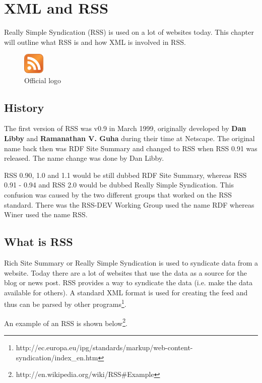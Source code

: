 \chapter{XML and RSS}
\label{chap:XML and RSS}
Really Simple Syndication (RSS) is used on a lot of websites today. This chapter will outline what RSS is and how XML is involved in RSS.

\begin{figure}[ht]
\begin{center}
\includegraphics[width=1cm]{Chapters/01_rss_icon.png}
\caption{Official logo\footnotemark}
\end{center}
\end{figure}


\section{History}
The first version of RSS was v0.9 in March 1999, originally developed by \textbf{Dan Libby} and \textbf{Ramanathan V. Guha} during their time at Netscape. The original name back then was RDF Site Summary and changed to RSS when RSS 0.91 was released. The name change was done by Dan Libby.

RSS 0.90, 1.0 and 1.1 would be still dubbed RDF Site Summary, whereas RSS 0.91 - 0.94 and RSS 2.0 would be dubbed Really Simple Syndication. This confusion was caused by the two different groups that worked on the RSS standard. There was the RSS-DEV Working Group used the name RDF whereas Winer used the name RSS.

\section{What is RSS}
\label{sec:what-is-rss}
Rich Site Summary or Really Simple Syndication is used to syndicate data from a website. Today there are a lot of websites that use the data as a source for the blog or news post. RSS provides a way to syndicate the data (i.e. make the data available for others). A standard XML format is used for creating the feed and thus can be parsed by other programs\footnote{http://ec.europa.eu/ipg/standards/markup/web-content-syndication/index\_en.htm}.

An example of an RSS is shown below\footnote{http://en.wikipedia.org/wiki/RSS\#Example}.

